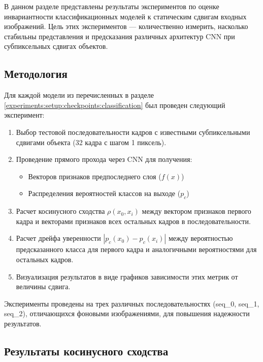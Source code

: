 В данном разделе представлены результаты экспериментов по оценке инвариантности классификационных моделей к статическим сдвигам входных изображений. Цель этих экспериментов — количественно измерить, насколько стабильны представления и предсказания различных архитектур CNN при субпиксельных сдвигах объектов.

\subsection{Методология}
\label{experiments:static:methodology}

Для каждой модели из перечисленных в разделе \ref{experiments:setup:checkpoints:classification} был проведен следующий эксперимент:

\begin{enumerate}
    \item Выбор тестовой последовательности кадров с известными субпиксельными сдвигами объекта (32 кадра с шагом 1 пиксель).
    
    \item Проведение прямого прохода через CNN для получения:
    \begin{itemize}
        \item Векторов признаков предпоследнего слоя ($f(x)$)
        \item Распределения вероятностей классов на выходе ($p_c$)
    \end{itemize}
    
    \item Расчет косинусного сходства $\rho(x_0, x_i)$ между вектором признаков первого кадра и векторами признаков всех остальных кадров в последовательности.
    
    \item Расчет дрейфа уверенности $|p_c(x_0) - p_c(x_i)|$ между вероятностью предсказанного класса для первого кадра и аналогичными вероятностями для остальных кадров.
    
    \item Визуализация результатов в виде графиков зависимости этих метрик от величины сдвига.
\end{enumerate}

Эксперименты проведены на трех различных последовательностях (seq\_0, seq\_1, seq\_2), отличающихся фоновыми изображениями, для повышения надежности результатов.

\subsection{Результаты косинусного сходства}
\label{experiments:static:cosine_similarity}

